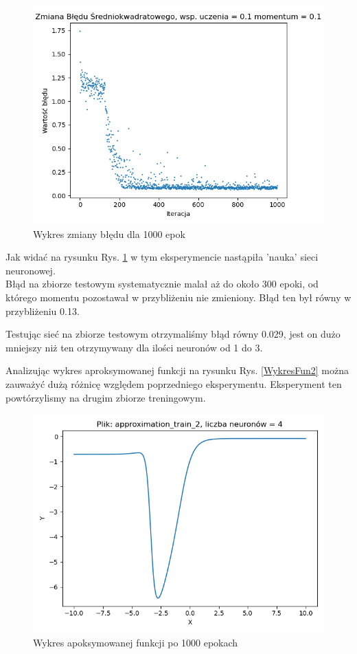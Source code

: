 \documentclass[12pt]{article}
\begin{document}
\begin{figure}[!htb]
 \centering
 \includegraphics[width=12cm]{ZmianaBledu4Neuron.png}
 \vspace{-0.3cm}
 \caption{Wykres zmiany błędu dla 1000 epok}
 \label{WykresBlad2}
\end{figure}


\newpage
Jak widać na rysunku Rys. \ref{WykresBlad2} w tym eksperymencie nastąpiła 'nauka' sieci neuronowej.\\

Błąd na zbiorze testowym systematycznie malał aż do około 300 epoki, od którego momentu pozostawał w przybliżeniu nie zmieniony. Błąd ten był równy w przybliżeniu 0.13.

Testując sieć na zbiorze testowym otrzymaliśmy błąd równy 0.029, jest on dużo mniejszy niż ten otrzymywany dla ilości neuronów od 1 do 3. 

Analizując wykres aproksymowanej funkcji na rysunku Rys. \ref{WykresFun2} można zauważyć dużą różnicę względem poprzedniego eksperymentu.
\newpage
Eksperyment ten powtórzylismy na drugim zbiorze treningowym. 

\begin{figure}[!htb]
 \centering
 \includegraphics[width=12cm]{FunctionPlot4NeuronZbior2.png}
 \caption{Wykres apoksymowanej funkcji po 1000 epokach}
 \vspace{-0.3cm}
 \label{WykresFun3}
\end{figure}
\end{document}
